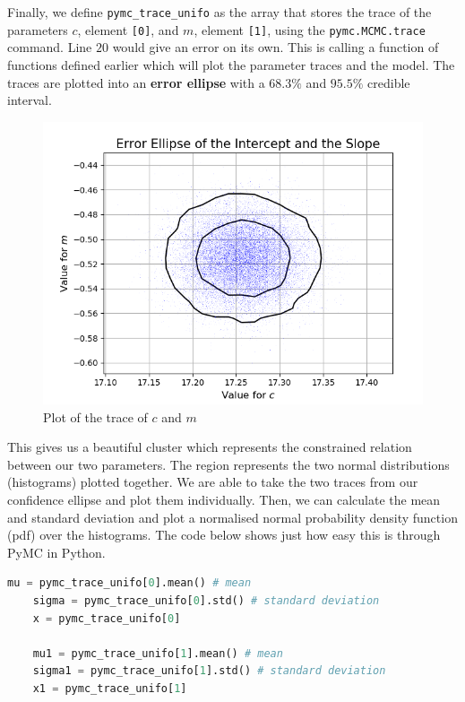 \documentclass[12pt,twoside]{report}   %
\begin{document}
Finally, we define \texttt{pymc\_trace\_unifo} as the array that stores the trace of the parameters $c$, element \texttt{[0]}, and $m$, element \texttt{[1]}, using the \texttt{pymc.MCMC.trace} command. Line $20$ would give an error on its own. This is calling a function of functions defined earlier which will plot the parameter traces and the model. The traces are plotted into an \textbf{error ellipse} with a $68.3\%$ and $95.5\%$ credible interval.
\begin{figure}[H]
\centering
\includegraphics[width = 5in]{Ellipse.png}
\caption{Plot of the trace of $c$ and $m$}
\label{figEllipse}
\end{figure}

This gives us a beautiful cluster which represents the constrained relation between our two parameters. The region represents the two normal distributions (histograms) plotted together. We are able to take the two traces from our confidence ellipse and plot them individually. Then, we can calculate the mean and standard deviation and plot a normalised normal probability density function (pdf) over the histograms. The code below shows just how easy this is through PyMC in Python.
\begin{lstlisting}[label={python code 6},caption={Linear code pdf plotting snippet},language=Python]
	mu = pymc_trace_unifo[0].mean() # mean
	sigma = pymc_trace_unifo[0].std() # standard deviation
	x = pymc_trace_unifo[0]
	
	mu1 = pymc_trace_unifo[1].mean() # mean
	sigma1 = pymc_trace_unifo[1].std() # standard deviation
	x1 = pymc_trace_unifo[1]
\end{lstlisting}
\end{document}
